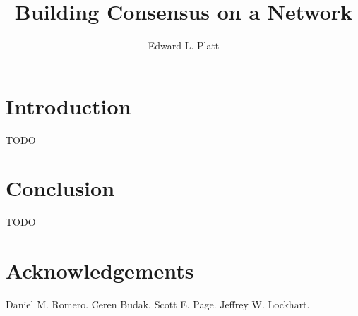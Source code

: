 \documentclass{book}
\author{Edward L. Platt}
\title{Building Consensus on a Network}
\begin{document}
\maketitle

\chapter{Introduction}
TODO

\chapter{Conclusion}
TODO

\chapter{Acknowledgements}
Daniel M. Romero.
Ceren Budak.
Scott E. Page.
Jeffrey W. Lockhart.



\end{document}
